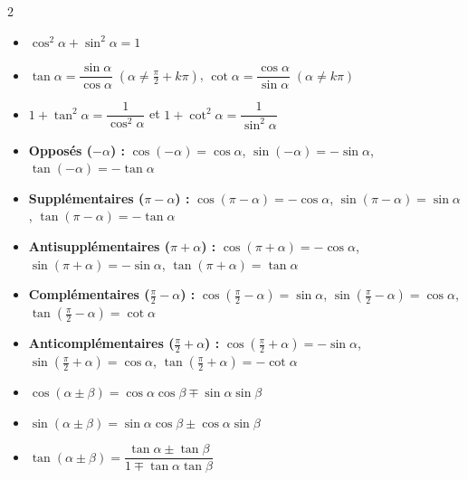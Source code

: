 {\fontsize{9.5pt}{11.5pt}\selectfont
\setlength{\columnsep}{18pt}
\begin{multicols}{2}

\begin{itemize}[leftmargin=1.2em, itemsep=1.5pt, topsep=2pt]
    \item $\cos^2\alpha + \sin^2\alpha = 1$
    \item $\tan\alpha = \dfrac{\sin\alpha}{\cos\alpha} \;\left(\alpha \neq \frac{\pi}{2}+k\pi\right)$, \quad $\cot\alpha = \dfrac{\cos\alpha}{\sin\alpha} \;(\alpha \neq k\pi)$
    \item $1 + \tan^2\alpha = \dfrac{1}{\cos^2\alpha}$ \quad et \quad $1 + \cot^2\alpha = \dfrac{1}{\sin^2\alpha}$
\end{itemize}

\vspace{3pt}
\begin{itemize}[leftmargin=1.2em, itemsep=1.5pt, topsep=2pt]
    \item \textbf{Opposés ($-\alpha$) :} $\cos(-\alpha) = \cos\alpha$, \; $\sin(-\alpha) = -\sin\alpha$, \; $\tan(-\alpha) = -\tan\alpha$
    \item \textbf{Supplémentaires ($\pi-\alpha$) :} $\cos(\pi-\alpha) = -\cos\alpha$, \; $\sin(\pi-\alpha) = \sin\alpha$, \; $\tan(\pi-\alpha) = -\tan\alpha$
    \item \textbf{Antisupplémentaires ($\pi+\alpha$) :} $\cos(\pi+\alpha) = -\cos\alpha$, \; $\sin(\pi+\alpha) = -\sin\alpha$, \; $\tan(\pi+\alpha) = \tan\alpha$
    \item \textbf{Complémentaires ($\frac{\pi}{2}-\alpha$) :} $\cos\left(\frac{\pi}{2}-\alpha\right) = \sin\alpha$, \; $\sin\left(\frac{\pi}{2}-\alpha\right) = \cos\alpha$, \; $\tan\left(\frac{\pi}{2}-\alpha\right) = \cot\alpha$
    \item \textbf{Anticomplémentaires ($\frac{\pi}{2}+\alpha$) :} $\cos\left(\frac{\pi}{2}+\alpha\right) = -\sin\alpha$, \; $\sin\left(\frac{\pi}{2}+\alpha\right) = \cos\alpha$, \; $\tan\left(\frac{\pi}{2}+\alpha\right) = -\cot\alpha$
\end{itemize}

\vspace{3pt}
\begin{itemize}[leftmargin=1.2em, itemsep=1.5pt, topsep=2pt]
    \item $\cos(\alpha \pm \beta) = \cos\alpha\cos\beta \mp \sin\alpha\sin\beta$
    \item $\sin(\alpha \pm \beta) = \sin\alpha\cos\beta \pm \cos\alpha\sin\beta$
    \item $\tan(\alpha \pm \beta) = \dfrac{\tan\alpha \pm \tan\beta}{1 \mp \tan\alpha\tan\beta}$
\end{itemize}


\end{multicols}}
